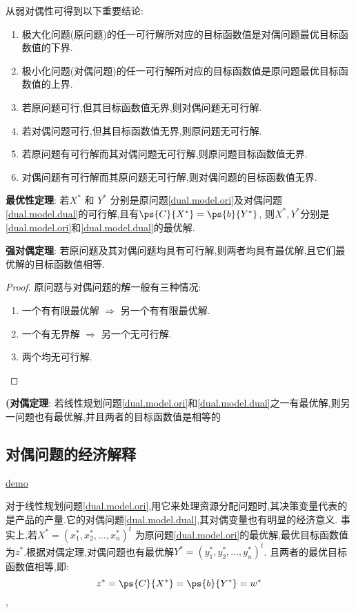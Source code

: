 \documentclass{article}
\begin{document}
从弱对偶性可得到以下重要结论:
\begin{enumerate}
\item 极大化问题(原问题)的任一可行解所对应的目标函数值是对偶问题最优目标函数值的下界.
\item 极小化问题(对偶问题)的任一可行解所对应的目标函数值是原问题最优目标函数值的上界.
\item 若原问题可行,但其目标函数值无界,则对偶问题无可行解.
\item 若对偶问题可行,但其目标函数值无界,则原问题无可行解.
\item 若原问题有可行解而其对偶问题无可行解,则原问题目标函数值无界.
\item 对偶问题有可行解而其原问题无可行解,则对偶问题的目标函数值无界.
\end{enumerate}

\begin{theorem}
\textbf{最优性定理}:
若$X^*$ 和 $Y^*$ 分别是原问题\eqref{dual.model.ori}及对偶问题\eqref{dual.model.dual}的可行解,且有$\ps{C}{X^*} = \ps{b}{Y^*}$,
则$X^*,Y^*$分别是\eqref{dual.model.ori}和\eqref{dual.model.dual}的最优解.
\end{theorem}

\begin{theorem}
\textbf{强对偶定理}:
若原问题及其对偶问题均具有可行解,则两者均具有最优解,且它们最优解的目标函数值相等.
\end{theorem}
\begin{proof}
原问题与对偶问题的解一般有三种情况:
\begin{enumerate}
\item 一个有有限最优解 $\Rightarrow$ 另一个有有限最优解.
\item 一个有无界解 $\Rightarrow$ 另一个无可行解.
\item 两个均无可行解.
\end{enumerate}
\end{proof}

\begin{theorem}
\textbf{(对偶定理}:
若线性规划问题\eqref{dual.model.ori}和\eqref{dual.model.dual}之一有最优解,则另一问题也有最优解,并且两者的目标函数值是相等的
\end{theorem}

\subsection{对偶问题的经济解释}
\href{http://course.cug.edu.cn/cugFirst/operational\_research/main/charpter2/p4.htm}{demo}

对于线性规划问题\eqref{dual.model.ori},用它来处理资源分配问题时,其决策变量代表的是产品的产量.它的对偶问题\eqref{dual.model.dual},其对偶变量也有明显的经济意义.
事实上,若$X^* = (x^*_1, x^*_2, \ldots, x^*_n)^t$
为原问题\eqref{dual.model.ori}的最优解,最优目标函数值为$z^*$.根据对偶定理,对偶问题也有最优解$Y^* = (y^*_1, y^*_2, \ldots, y^*_n)^t$.
且两者的最优目标函数值相等,即:
$$z^* = \ps{C}{X^*} = \ps{b}{Y^*} = w^*$$,
 
\end{document}

